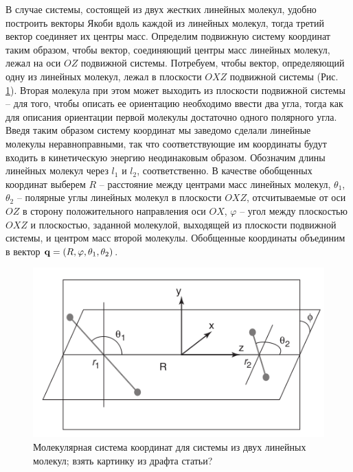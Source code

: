 В случае системы, состоящей из двух жестких линейных молекул, удобно построить векторы Якоби вдоль каждой из линейных молекул, тогда третий вектор соединяет их центры масс. Определим подвижную систему координат таким образом, чтобы вектор, соединяющий центры масс линейных молекул, лежал на оси $OZ$ подвижной системы. Потребуем, чтобы вектор, определяющий одну из линейных молекул, лежал в плоскости $OXZ$ подвижной системы (Рис. \ref{fig:two-linear-molecules-body-fixed}). Вторая молекула при этом может выходить из плоскости подвижной системы -- для того, чтобы описать ее ориентацию необходимо ввести два угла, тогда как для описания ориентации первой молекулы достаточно одного полярного угла. Введя таким образом систему координат мы заведомо сделали линейные молекулы неравноправными, так что соответствующие им координаты будут входить в кинетическую энергию неодинаковым образом. Обозначим длины линейных молекул через $l_1$ и $l_2$, соответственно. В качестве обобщенных координат выберем $R$ -- расстояние между центрами масс линейных молекул, $\theta_1$, $\theta_2$ -- полярные углы линейных молекул в плоскости $OXZ$, отсчитываемые от оси $OZ$ в сторону положительного направления оси $OX$, $\varphi$ -- угол между плоскостью $OXZ$ и плоскостью, заданной молекулой, выходящей из плоскости подвижной системы, и центром масс второй молекулы. Обобщенные координаты объединим в вектор $\mathbf{q} = \left( R, \varphi, \theta_1, \theta_2 \right)$. 

\begin{figure}[H]
    \centering
    \includegraphics[width=0.5\linewidth]{pictures/n2n2_coordinate_frame.png}
    \caption{Молекулярная система координат для системы из двух линейных молекул; взять картинку из драфта статьи?}
    \label{fig:two-linear-molecules-body-fixed}
\end{figure}

